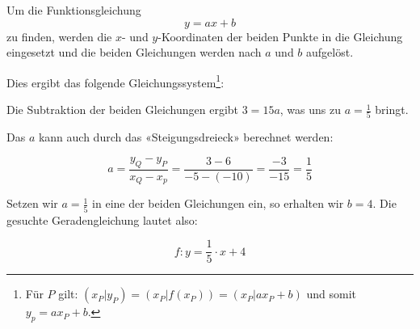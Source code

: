 \begin{rezept}{}{}
Um die Funktionsgleichung $$y=ax+b$$ zu finden,
  werden die $x$- und $y$-Koordinaten der beiden Punkte in die Gleichung eingesetzt und die beiden Gleichungen werden nach $a$ und $b$ aufgelöst. 
\end{rezept}

\noTRAINER{\vspace{12mm}}

Dies ergibt das folgende Gleichungssystem\footnote{Für $P$ gilt: $(x_P|y_P)=(x_P|f(x_P))=(x_P|ax_P+b)$ und somit $y_p =ax_P + b$.}:


Die Subtraktion der beiden Gleichungen ergibt $3 = 15a$, was uns zu $a=\frac{1}{5}$ bringt.

Das $a$ kann auch durch das «Steigungsdreieck» berechnet werden:

$$a = \frac{y_Q-y_P}{x_Q-x_p} = \frac{3 - 6}{-5 - (-10)} = \frac{-3}{-15} = \frac{1}{5}$$

Setzen wir $a=\frac{1}{5}$ in eine der beiden Gleichungen ein, so erhalten wir $b=4$. Die gesuchte Geradengleichung lautet also:

$$f: y=\frac{1}{5}\cdot{}x + 4$$


\newpage

